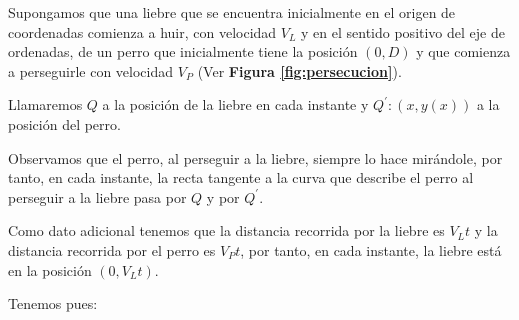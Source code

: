 \begin{example}
Supongamos que una liebre que se encuentra inicialmente en el origen de coordenadas comienza a huir, con velocidad $V_L$ y en el sentido positivo del eje de ordenadas, de un perro que inicialmente tiene la posición $(0,D)$ y que comienza a perseguirle con velocidad $V_P$ (Ver \textbf{Figura \ref{fig:persecucion}}).

Llamaremos $Q$ a la posición de la liebre en cada instante y $Q^\prime:(x,y(x))$ a la posición del perro.

Observamos que el perro, al perseguir a la liebre, siempre lo hace mirándole, por tanto, en cada instante, la recta tangente a la curva que describe el perro al perseguir a la liebre pasa por $Q$ y por $Q^\prime$.

Como dato adicional tenemos que la distancia recorrida por la liebre es $V_Lt$ y la distancia recorrida por el perro es $V_Pt$, por tanto, en cada instante, la liebre está en la posición $(0, V_Lt)$.

Tenemos pues:


\end{example}
